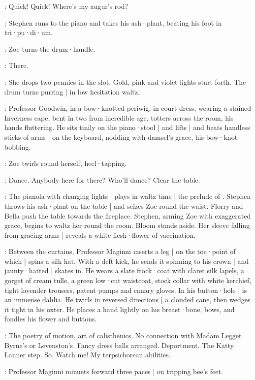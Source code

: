 \Stephen:
Quick!
Quick!
Where's my augur's rod?

:
Stephen runs to the piano and takes his ash·plant,
beating his foot in tri·pu·di·um.

:
Zoe turns the drum·handle.

\Zoe:
There.

:
She drops two pennies in the slot.
Gold,
pink and violet lights start forth.
The drum turns purring |
in low hesitation waltz.

:
Professor Goodwin,
in a bow·knotted periwig,
in court dress,
wearing a stained Inverness cape,
bent in two from incredible age,
totters across the room,
his hands fluttering.
%
He sits tinily on the piano·stool |
and lifts |
and beats handless sticks of arms |
on the keyboard,
nodding with damsel's grace,
his bow·knot bobbing.

:
Zoe twirls round herself,
heel·tapping.

\Zoe:
Dance.
Anybody here for there?
Who'll dance?
Clear the table.

:
The pianola with changing lights |
plays in waltz time |
the prelude of .
Stephen throws his ash·plant on the table |
and seizes Zoe round the waist.
Florry and Bella push the table towards the fireplace.
Stephen,
arming Zoe with exaggerated grace,
begins to waltz her round the room.
Bloom stands aside.
%
Her sleeve falling from gracing arms |
reveals a white flesh·flower of vaccination.

:
Between the curtains,
Professor Maginni inserts a leg |
on the toe·point of which |
spins a silk hat.
With a deft kick,
he sends it spinning to his crown |
and jaunty·hatted |
skates in.
He wears a slate frock·coat with claret silk lapels,
a gorget of cream tulle,
a green low·cut waistcoat,
stock collar with white kerchief,
tight lavender trousers,
patent pumps
and canary gloves.
In his button·hole |
is an immense dahlia.
He twirls in reversed directions |
a clouded cane,
then wedges it tight in his oxter.
He places a hand lightly on his breast·bone,
%
bows,
and fondles his flower and buttons.

\Maginni[2]:
The poetry of motion,
art of calisthenics.
No connection with Madam Legget Byrne's or Levenston's.
Fancy dress balls arranged.
Deportment.
The Katty Lanner step.
So.
Watch me!
My terpsichorean abilities.

:
Professor Maginni minuets forward three paces |
on tripping bee's feet.

